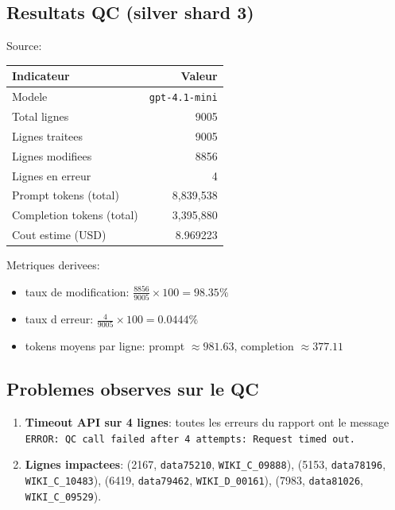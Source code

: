 \documentclass[11pt,a4paper]{article}
\begin{document}
\subsection{Resultats QC (silver shard 3)}
Source: 

\begin{center}
\begin{tabular}{lr}
\toprule
Indicateur & Valeur \\
\midrule
Modele & \texttt{gpt-4.1-mini} \\
Total lignes & 9005 \\
Lignes traitees & 9005 \\
Lignes modifiees & 8856 \\
Lignes en erreur & 4 \\
Prompt tokens (total) & 8,839,538 \\
Completion tokens (total) & 3,395,880 \\
Cout estime (USD) & 8.969223 \\
\bottomrule
\end{tabular}
\end{center}

\noindent Metriques derivees:
\begin{itemize}[leftmargin=*]
  \item taux de modification: $\frac{8856}{9005}\times 100 = 98.35\%$
  \item taux d erreur: $\frac{4}{9005}\times 100 = 0.0444\%$
  \item tokens moyens par ligne: prompt $\approx 981.63$, completion $\approx 377.11$
\end{itemize}

\subsection{Problemes observes sur le QC}
\begin{enumerate}[leftmargin=*]
  \item \textbf{Timeout API sur 4 lignes}: toutes les erreurs du rapport ont le message\newline
  \texttt{ERROR: QC call failed after 4 attempts: Request timed out.}
  \item \textbf{Lignes impactees}:\newline
  (2167, \texttt{data75210}, \texttt{WIKI\_C\_09888}),\newline
  (5153, \texttt{data78196}, \texttt{WIKI\_C\_10483}),\newline
  (6419, \texttt{data79462}, \texttt{WIKI\_D\_00161}),\newline
  (7983, \texttt{data81026}, \texttt{WIKI\_C\_09529}).
\end{enumerate}
\end{document}
